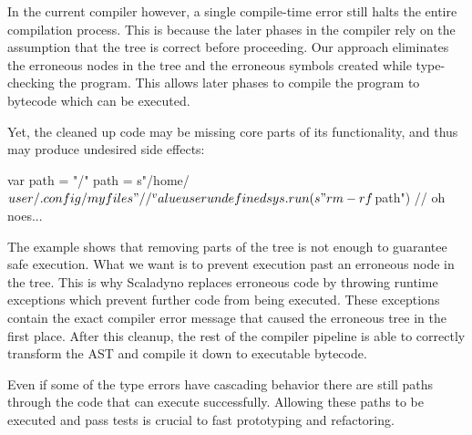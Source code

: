 In the current compiler however, a single compile-time error still halts the entire compilation process. This is because the later phases in the compiler rely on the assumption that the tree is correct before proceeding. Our approach eliminates the erroneous nodes in the tree and the erroneous symbols created while type-checking the program. This allows later phases to compile the program to bytecode which can be executed.

Yet, the cleaned up code may be missing core parts of its functionality, and thus may produce undesired side effects:

\begin{lstlisting-nobreak}
 var path = "/"
 path = s"/home/$user/.config/myfiles"
 //                  ^ value user undefined
 sys.run(s"rm -rf $path") // oh noes...
\end{lstlisting-nobreak}

The example shows that removing parts of the tree is not enough to guarantee safe execution. What we want is to prevent execution past an erroneous node in the tree. This is why Scaladyno replaces erroneous code by throwing runtime exceptions which prevent further code from being executed. These exceptions contain the exact compiler error message that caused the erroneous tree in the first place. After this cleanup, the rest of the compiler pipeline is able to correctly transform the AST and compile it down to executable bytecode.

Even if some of the type errors have cascading behavior there are still paths through the code that can execute successfully. Allowing these paths to be executed and pass tests is crucial to fast prototyping and refactoring.
